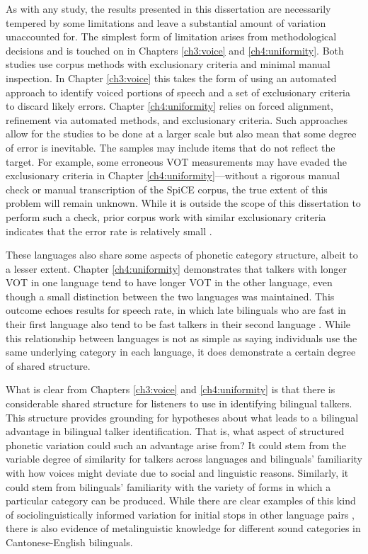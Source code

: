 As with any study, the results presented in this dissertation are necessarily tempered by some limitations and leave a substantial amount of variation unaccounted for. The simplest form of limitation arises from methodological decisions and is touched on in Chapters \ref{ch3:voice} and \ref{ch4:uniformity}. Both studies use corpus methods with exclusionary criteria and minimal manual inspection. In Chapter \ref{ch3:voice} this takes the form of using an automated approach to identify voiced portions of speech and a set of exclusionary criteria to discard likely errors. Chapter \ref{ch4:uniformity} relies on forced alignment, refinement via automated methods, and exclusionary criteria. Such approaches allow for the studies to be done at a larger scale but also mean that some degree of error is inevitable. The samples may include items that do not reflect the target. For example, some erroneous VOT measurements may have evaded the exclusionary criteria in Chapter \ref{ch4:uniformity}---without a rigorous manual check or manual transcription of the SpiCE corpus, the true extent of this problem will remain unknown. While it is outside the scope of this dissertation to perform such a check, prior corpus work with similar exclusionary criteria indicates that the error rate is relatively small \citep[5\%:][]{chodroff_2019_l2}.

These languages also share some aspects of phonetic category structure, albeit to a lesser extent. Chapter \ref{ch4:uniformity} demonstrates that talkers with longer VOT in one language tend to have longer VOT in the other language, even though a small distinction between the two languages was maintained. This outcome echoes results for speech rate, in which late bilinguals who are fast in their first language also tend to be fast talkers in their second language \citep{bradlow_2017_rate}. While this relationship between languages is not as simple as saying individuals use the same underlying category in each language, it does demonstrate a certain degree of shared structure.

What is clear from Chapters \ref{ch3:voice} and \ref{ch4:uniformity} is that there is considerable shared structure for listeners to use in identifying bilingual talkers. This structure provides grounding for hypotheses about what leads to a bilingual advantage in bilingual talker identification. That is, what aspect of structured phonetic variation could such an advantage arise from? It could stem from the variable degree of similarity for talkers across languages and bilinguals' familiarity with how voices might deviate due to social and linguistic reasons. Similarly, it could stem from bilinguals' familiarity with the variety of forms in which a particular category can be produced. While there are clear examples of this kind of sociolinguistically informed variation for initial stops in other language pairs \citep{bullock_2009_sociophonetics}, there is also evidence of metalinguistic knowledge for different sound categories in Cantonese-English bilinguals. 

